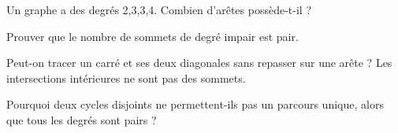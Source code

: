 \documentclass[11pt]{article}
\begin{document}
Un graphe a des degrés 2,3,3,4. Combien d’arêtes possède-t-il ?\par
\vspace{5pt}
Prouver que le nombre de sommets de degré impair est pair.\par
\vspace{5pt}
Peut-on tracer un carré et ses deux diagonales sans repasser sur une arête ? Les intersections intérieures ne sont pas des sommets.\par
\vspace{5pt}
Pourquoi deux cycles disjoints ne permettent-ils pas un parcours unique, alors que tous les degrés sont pairs ?\par
\vspace{5pt}
\end{document}
